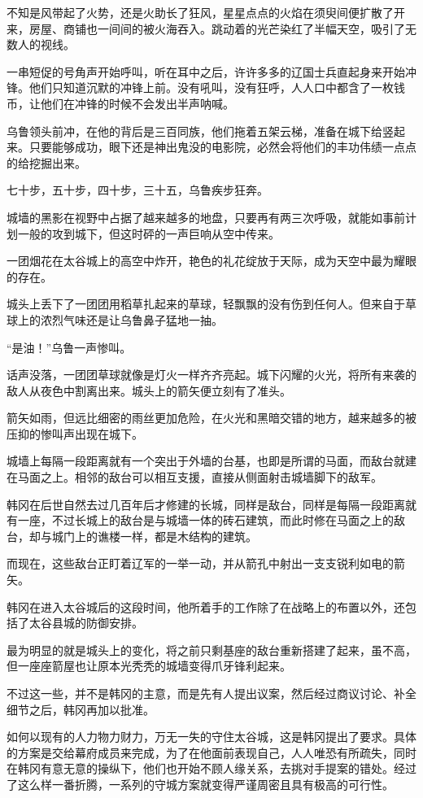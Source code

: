 不知是风带起了火势，还是火助长了狂风，星星点点的火焰在须臾间便扩散了开来，房屋、商铺也一间间的被火海吞入。跳动着的光芒染红了半幅天空，吸引了无数人的视线。

一串短促的号角声开始呼叫，听在耳中之后，许许多多的辽国士兵直起身来开始冲锋。他们只知道沉默的冲锋上前。没有吼叫，没有狂呼，人人口中都含了一枚钱币，让他们在冲锋的时候不会发出半声呐喊。

乌鲁领头前冲，在他的背后是三百同族，他们拖着五架云梯，准备在城下给竖起来。只要能够成功，眼下还是神出鬼没的电影院，必然会将他们的丰功伟绩一点点的给挖掘出来。

七十步，五十步，四十步，三十五，乌鲁疾步狂奔。

城墙的黑影在视野中占据了越来越多的地盘，只要再有两三次呼吸，就能如事前计划一般的攻到城下，但这时砰的一声巨响从空中传来。

一团烟花在太谷城上的高空中炸开，艳色的礼花绽放于天际，成为天空中最为耀眼的存在。

城头上丢下了一团团用稻草扎起来的草球，轻飘飘的没有伤到任何人。但来自于草球上的浓烈气味还是让乌鲁鼻子猛地一抽。

“是油！”乌鲁一声惨叫。

话声没落，一团团草球就像是灯火一样齐齐亮起。城下闪耀的火光，将所有来袭的敌人从夜色中割离出来。城头上的箭矢便立刻有了准头。

箭矢如雨，但远比细密的雨丝更加危险，在火光和黑暗交错的地方，越来越多的被压抑的惨叫声出现在城下。

城墙上每隔一段距离就有一个突出于外墙的台基，也即是所谓的马面，而敌台就建在马面之上。相邻的敌台可以相互支援，直接从侧面射击城墙脚下的敌军。

韩冈在后世自然去过几百年后才修建的长城，同样是敌台，同样是每隔一段距离就有一座，不过长城上的敌台是与城墙一体的砖石建筑，而此时修在马面之上的敌台，却与城门上的谯楼一样，都是木结构的建筑。

而现在，这些敌台正盯着辽军的一举一动，并从箭孔中射出一支支锐利如电的箭矢。

韩冈在进入太谷城后的这段时间，他所着手的工作除了在战略上的布置以外，还包括了太谷县城的防御安排。

最为明显的就是城头上的变化，将之前只剩基座的敌台重新搭建了起来，虽不高，但一座座箭屋也让原本光秃秃的城墙变得爪牙锋利起来。

不过这一些，并不是韩冈的主意，而是先有人提出议案，然后经过商议讨论、补全细节之后，韩冈再加以批准。

如何以现有的人力物力财力，万无一失的守住太谷城，这是韩冈提出了要求。具体的方案是交给幕府成员来完成，为了在他面前表现自己，人人唯恐有所疏失，同时在韩冈有意无意的操纵下，他们也开始不顾人缘关系，去挑对手提案的错处。经过了这么样一番折腾，一系列的守城方案就变得严谨周密且具有极高的可行性。

